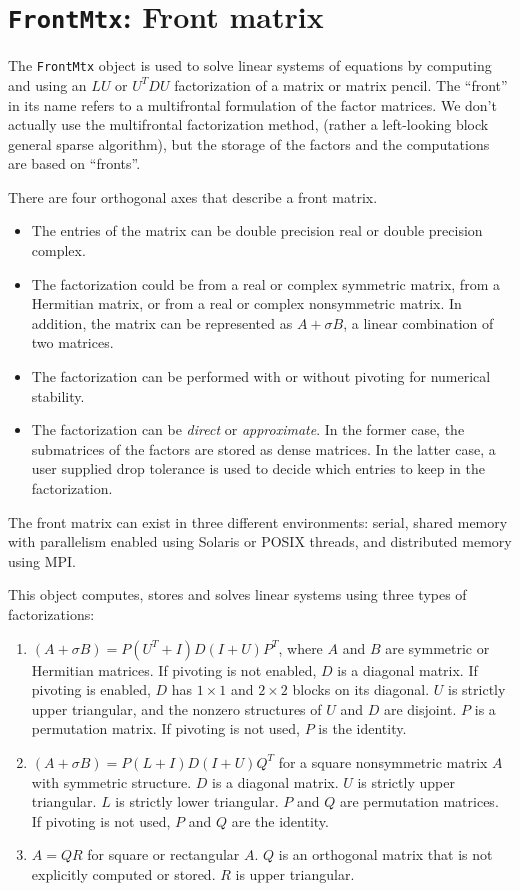 \par
\chapter{{\tt FrontMtx}: Front matrix}
\par
The {\tt FrontMtx} object is used to solve linear systems of
equations by computing and using an $LU$ or $U^TDU$ factorization
of a matrix or matrix pencil.
The ``front'' in its name refers to a multifrontal formulation of
the factor matrices.
We don't actually use the multifrontal factorization method,
(rather a left-looking block general sparse algorithm), but the
storage of the factors and the computations are based on ``fronts''.
\par
There are four orthogonal axes that describe a front matrix.
\begin{itemize}
\item
The entries of the matrix can be double precision real or double
precision complex.
\item
The factorization could be from a real or complex symmetric matrix,
from a Hermitian matrix, or from a real or complex nonsymmetric matrix.
In addition, the matrix can be represented as $A + \sigma B$,
a linear combination of two matrices.
\item
The factorization can be performed with or without pivoting
for numerical stability.
\item
The factorization can be {\it direct} or {\it approximate}.
In the former case, the submatrices of the factors
are stored as dense matrices.
In the latter case, a user supplied drop tolerance is used to
decide which entries to keep in the factorization.
\end{itemize}
The front matrix can exist in three different environments:
serial, shared memory with parallelism enabled using Solaris or
POSIX threads, and distributed memory using MPI.
\par
This object computes, stores and solves linear
systems using three types of factorizations:
\begin{enumerate}
\item 
$(A + \sigma B) = P(U^T + I)D(I + U)P^T$,
where $A$ and $B$ are symmetric or Hermitian matrices.
If pivoting is not enabled, $D$ is a diagonal matrix.
If pivoting is enabled, $D$ has $1 \times 1$ and $2 \times 2$
blocks on its diagonal.
$U$ is strictly upper triangular, and the nonzero structures
of $U$ and $D$ are disjoint.
$P$ is a permutation matrix.
If pivoting is not used, $P$ is the identity.
\item
$(A + \sigma B) = P(L + I)D(I + U)Q^T$ for a square
nonsymmetric matrix $A$ with symmetric structure.
$D$ is a diagonal matrix.
$U$ is strictly upper triangular.
$L$ is strictly lower triangular.
$P$ and $Q$ are permutation matrices.
If pivoting is not used, $P$ and $Q$ are the identity.
\item
$A = QR$ for square or rectangular $A$.
$Q$ is an orthogonal matrix that is not explicitly computed or
stored.
$R$ is upper triangular.
\end{enumerate}
